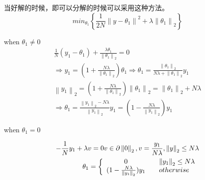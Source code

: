 \documentclass[lang=cn,11pt,a4paper]{elegantpaper}
\theoremstyle{plain}
\theoremstyle{remark}
\begin{document}
当好解的时候，即可以分解的时候可以采用这种方法。
$$ min_{\theta_1} \left\{ \frac{1}{2N} \left\| y-\theta_1 \right\|^2+\lambda \left\| \theta_1 \right\|_2   \right\}  $$

when $\theta_1 \ne 0$ 
\begin{equation*}
    \begin{aligned}
        \frac{1}{N} (y_1-\theta_1)+\frac{\lambda \theta_1}{\left\| \theta_1 \right\|_2 } = 0\\
        \Rightarrow y_1 = (1+\frac{N\lambda}{\left\| \theta_1 \right\|_2 })\theta_1\Rightarrow \theta_1 = \frac{\left\| \theta_1 \right\|_2 }{N\lambda+\left\| \theta_1 \right\|_2 }y_1\\
        \left\| y_1 \right\| _2 = (1+\frac{N\lambda}{\left\| \theta_1 \right\|_2 })\left\| \theta_1 \right\|_2=\left\| \theta_1 \right\|_2+N\lambda  \\
        \Rightarrow \theta_1 = \frac{\left\| y_1 \right\|_2 - N\lambda }{\left\| y_1 \right\|_2 }y_1 = (1-\frac{N\lambda}{\left\| y_1 \right\| _2})y_1
    \end{aligned}
\end{equation*}

when $\theta_1 = 0$ 

\begin{equation*}
    \begin{aligned}
        -\frac{1}{N} y_1 + \lambda v = 0
        v\in \partial \left\| 0 \right\| _2 ,v= \frac{y_1}{N\lambda},\left\| y \right\| _2 \leq N\lambda \\
        \theta_1 = \left\{\begin{array}{c l}
            0 &\quad \left\| y_1 \right\| _2 \leq N\lambda\\
            (1-\frac{N\lambda}{\left\| y_1 \right\|_2})y_1 &\quad otherwise
        \end{array}\right.
    \end{aligned}
\end{equation*}












\end{document}
